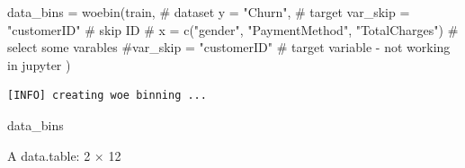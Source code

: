\documentclass[
  letterpaper,
  DIV=11,
  numbers=noendperiod]{scrreprt}
\newenvironment{Shaded}{\begin{snugshade}}{\end{snugshade}}
\newcommand{\AttributeTok}[1]{\textcolor[rgb]{0.40,0.45,0.13}{#1}}
\newcommand{\CommentTok}[1]{\textcolor[rgb]{0.37,0.37,0.37}{#1}}
\newcommand{\FunctionTok}[1]{\textcolor[rgb]{0.28,0.35,0.67}{#1}}
\newcommand{\NormalTok}[1]{\textcolor[rgb]{0.00,0.23,0.31}{#1}}
\newcommand{\OtherTok}[1]{\textcolor[rgb]{0.00,0.23,0.31}{#1}}
\newcommand{\StringTok}[1]{\textcolor[rgb]{0.13,0.47,0.30}{#1}}
\providecommand{\tightlist}{%
  \setlength{\itemsep}{0pt}\setlength{\parskip}{0pt}}\usepackage{longtable,booktabs,array}
\begin{document}
\begin{Shaded}
\begin{Highlighting}[]
\NormalTok{data\_bins }\OtherTok{=} \FunctionTok{woebin}\NormalTok{(train, }\CommentTok{\# dataset}
                   \AttributeTok{y =} \StringTok{"Churn"}\NormalTok{, }\CommentTok{\# target}
                   \AttributeTok{var\_skip =} \StringTok{"customerID"} \CommentTok{\# skip ID}
                  \CommentTok{\# x = c("gender", "PaymentMethod", "TotalCharges") \# select some varables}
                   \CommentTok{\#var\_skip = "customerID" \# target variable {-} not working in jupyter}
\NormalTok{             )}
\end{Highlighting}
\end{Shaded}

\begin{verbatim}
[INFO] creating woe binning ... 
\end{verbatim}

\begin{Shaded}
\begin{Highlighting}[]
\NormalTok{data\_bins}
\end{Highlighting}
\end{Shaded}

\begin{description}
\tightlist
\item[\$gender]
A data.table: 2 × 12
\end{description}
\end{document}
